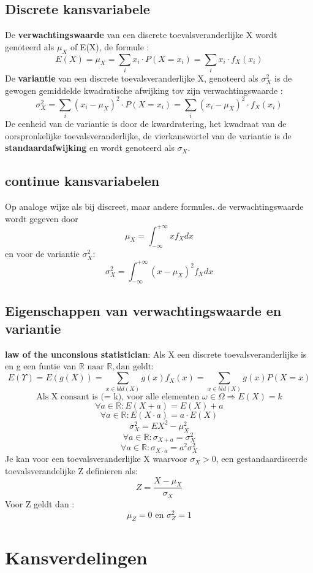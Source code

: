 \documentclass{report}
\begin{document}
	  		\subsection{Discrete kansvariabele}
	  			De \textbf{verwachtingswaarde} van een discrete toevalsveranderlijke X wordt genoteerd als \(\mu_X\) of E(X), de formule : 
	  			\[E(X) = \mu_X = \sum_{i}x_i\cdot P(X = x_i) =  \sum_{i}x_i\cdot f_X(x_i)\]
	  			De \textbf{variantie} van een discrete toevalsveranderlijke X, genoteerd als \(\sigma_X^2\) is de gewogen gemiddelde kwadratische afwijking tov zijn verwachtingswaarde : 
	  			\[\sigma_X^2 = \sum_{i}(x_i - \mu_X)^2 \cdot P(X = x_i) =  \sum_{i}(x_i - \mu_X)^2\cdot f_X(x_i)\]
	  			De eenheid van de variantie is door de kwardratering, het kwadraat van de oorspronkelijke toevalsveranderlijke, de vierkanswortel van de variantie is de \textbf{standaardafwijking} en wordt genoteerd als \(\sigma_X\).
	  		\subsection{continue kansvariabelen}
	  			Op analoge wijze als bij discreet, maar andere formules. de verwachtingswaarde wordt gegeven door 
	  			\[\mu_X = \int_{-\infty}^{+\infty}xf_Xdx\]
	  			en voor de variantie \(\sigma_X^2\): 
	  			\[\sigma_X^2 =  \int_{-\infty}^{+\infty}(x - \mu_X)^2f_Xdx\]
	  		\subsection{Eigenschappen van verwachtingswaarde en variantie}
	  			\textbf{law of the unconsious statistician}: Als X een discrete toevalsveranderlijke is en g een funtie van \(\mathbb{R} \textrm{ naar } \mathbb{R}, \textrm{dan geldt}: \)
	  			\[E(\Upsilon) = E(g(X)) = \sum_{x\in bld(X)} g(x)f_X(x) = \sum_{x\in bld(X)}g(x)P(X = x)\]
	  			\[\textrm{Als X consant is (= k), voor alle elementen } \omega \in \Omega \Rightarrow E(X) = k\]
	  			\[\forall a \in \mathbb{R} : E(X + a) = E(X) + a\]
	  			\[\forall a \in \mathbb{R} : E(X\cdot a) = a\cdot E(X)\]
	  			\[\sigma_X^2 = EX^2 - \mu_X^2\]
	  			\[\forall a \in \mathbb{R} : \sigma_{X + a} = \sigma_X^2\]
	  			\[\forall a \in \mathbb{R} :  \sigma_{X \cdot a} = a^2\sigma_X^2\]
	  			Je kan voor een toevalsveranderlijke X waarvoor \(\sigma_X > 0\), een gestandaardiseerde toevalsverandelijke Z definieren als: 
	  			\[Z = \frac{X - \mu_X}{\sigma_X}\]
	  			Voor Z geldt dan : 
	  			\[\mu_Z = 0 \textrm{ en } \sigma_Z^2 = 1\]
	  	\section{Kansverdelingen}
\end{document}
